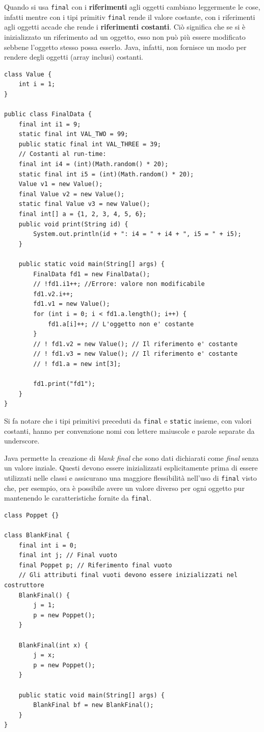 \documentclass[12pt]{report}
\begin{document}
Quando si usa \texttt{final} con i \textbf{riferimenti} agli oggetti cambiano leggermente le cose, infatti mentre con i tipi primitiv \texttt{final} rende il valore costante, con i riferimenti agli oggetti accade che rende i \textbf{riferimenti costanti}. Ciò significa che se si è inizializzato un riferimento ad un oggetto, esso non può più essere modificato sebbene l'oggetto stesso possa esserlo. Java, infatti, non fornisce un modo per rendere degli oggetti (array inclusi) costanti.
\begin{example}{}{}
\begin{lstlisting}[style=javastyle]
class Value {
	int i = 1;
}

public class FinalData {
	final int i1 = 9;
	static final int VAL_TWO = 99;
	public static final int VAL_THREE = 39;
	// Costanti al run-time:
	final int i4 = (int)(Math.random() * 20);
	static final int i5 = (int)(Math.random() * 20);
	Value v1 = new Value();
	final Value v2 = new Value();
	static final Value v3 = new Value();
	final int[] a = {1, 2, 3, 4, 5, 6};
	public void print(String id) {
		System.out.println(id + ": i4 = " + i4 + ", i5 = " + i5);
	}

	public static void main(String[] args) {
		FinalData fd1 = new FinalData();
		// !fd1.i1++; //Errore: valore non modificabile
		fd1.v2.i++;
		fd1.v1 = new Value();
		for (int i = 0; i < fd1.a.length(); i++) {
			fd1.a[i]++; // L'oggetto non e' costante
		}
		// ! fd1.v2 = new Value(); // Il riferimento e' costante
		// ! fd1.v3 = new Value(); // Il riferimento e' costante
		// ! fd1.a = new int[3];

		fd1.print("fd1");
	}
}
\end{lstlisting}
Si fa notare che i tipi primitivi preceduti da \texttt{final} e \texttt{static} insieme, con valori costanti, hanno per convenzione nomi con lettere maiuscole e parole separate da underscore.
\end{example}
Java permette la creazione di \textit{blank final} che sono dati dichiarati come \textit{final} senza un valore inziale. Questi devono essere inizializzati esplicitamente prima di essere utilizzati nelle classi e assicurano una maggiore flessibilità nell'uso di \texttt{final} visto che, per esempio, ora è possibile avere un valore diverso per ogni oggetto pur mantenendo le caratteristiche fornite da \texttt{final}.
\begin{lstlisting}[style=javastyle]
class Poppet {}

class BlankFinal {
	final int i = 0;
	final int j; // Final vuoto
	final Poppet p; // Riferimento final vuoto
	// Gli attributi final vuoti devono essere inizializzati nel costruttore
	BlankFinal() {
		j = 1;
		p = new Poppet();
	}

	BlankFinal(int x) {
		j = x;
		p = new Poppet();
	}

	public static void main(String[] args) {
		BlankFinal bf = new BlankFinal();
	}
}
\end{lstlisting}
\end{document}
